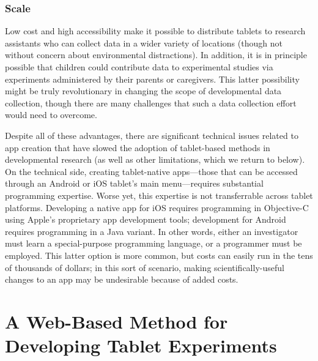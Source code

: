 \documentclass[man,noapacite]{apa2}
\begin{document}
\subsubsection{Scale} Low cost and high accessibility make it possible to distribute tablets to research assistants who can collect data in a wider variety of locations (though not without concern about environmental distractions). In addition, it is in principle possible that children could contribute data to experimental studies via experiments administered by their parents or caregivers.
This latter possibility might be truly revolutionary in changing the scope of developmental data collection, though there are many challenges that such a data collection effort would need to overcome.

Despite all of these advantages, there are significant technical issues related to app creation that have slowed the adoption of tablet-based methods in developmental research (as well as other limitations, which we return to below). On the technical side, creating tablet-native apps---those that can be accessed through an Android or iOS tablet's main menu---requires substantial programming expertise. Worse yet, this expertise is not transferrable across tablet platforms. Developing a native app for iOS requires programming in Objective-C using Apple's proprietary app development tools; development for Android requires programming in a Java variant. In other words, either an investigator must learn a special-purpose programming language, or a programmer must be employed. This latter option is more common, but costs can easily run in the tens of thousands of dollars; in this sort of scenario, making scientifically-useful changes to an app may be undesirable because of added costs. 

\section{A Web-Based Method for Developing Tablet Experiments}
\end{document}
